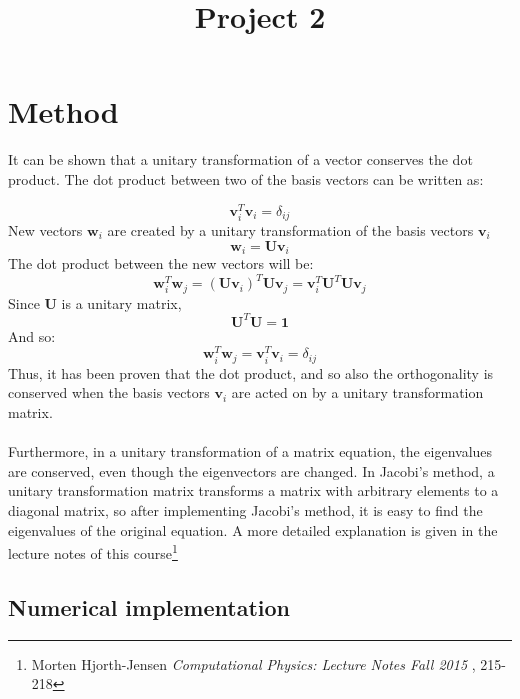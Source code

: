 \documentclass[12pt]{article}
\begin{document}
\title{Project 2}
\maketitle
\section{Method}



It can be shown that a unitary transformation of a vector conserves the dot product. 
The dot product between two of the basis vectors can be written as:

\begin{equation*}
\mathbf{v}_i^T \mathbf{v}_i=  \delta_{ij}
\end{equation*}
New vectors $\mathbf{w}_i$ are created by a unitary transformation of the basis vectors $\mathbf{v}_i$ 
\begin{equation*}
\mathbf{w}_i = \mathbf{Uv}_i
\end{equation*}
The dot product between the new vectors will be:
\begin{equation*}
\mathbf{w}_i^T\mathbf{w}_j  = (\mathbf{U}\mathbf{v}_i)^T\mathbf{U}\mathbf{v}_j = \mathbf{v}_i^T\mathbf{U}^T\mathbf{U}\mathbf{v}_j
\end{equation*}
Since $\mathbf{U}$ is a unitary matrix, 
\begin{equation*}
\mathbf{U}^T\mathbf{U} = \mathbf{1}
\end{equation*}
And so:
\begin{equation*}
\mathbf{w}_i^T\mathbf{w}_j  = \mathbf{v}_i^T \mathbf{v}_i=  \delta_{ij}
\end{equation*}
Thus, it has been proven that the dot product, and so also the orthogonality is conserved when the basis vectors $\mathbf{v}_i$ are acted on by a unitary transformation matrix. 
\\
\\
Furthermore, in a unitary transformation of a matrix equation, the eigenvalues are conserved, even though the eigenvectors are changed.  In Jacobi's method, a unitary transformation matrix transforms a matrix with arbitrary elements to a diagonal matrix, so after implementing Jacobi's method, it is easy to find the eigenvalues of the original equation. A more detailed explanation is given in the lecture notes of this course\footnote{Morten Hjorth-Jensen \textit{Computational Physics: Lecture Notes Fall 2015 }, 215-218} 
\subsection{Numerical implementation}
\end{document}
